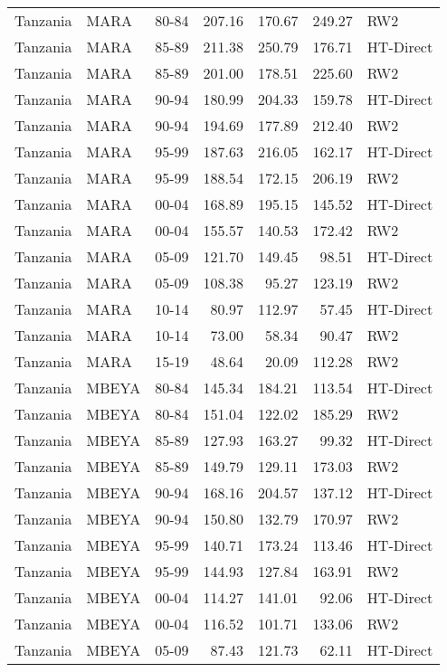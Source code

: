 \begin{longtable}{lllrrrl}
  Tanzania & MARA & 80-84 & 207.16 & 170.67 & 249.27 & RW2 \\ 
  Tanzania & MARA & 85-89 & 211.38 & 250.79 & 176.71 & HT-Direct \\ 
  Tanzania & MARA & 85-89 & 201.00 & 178.51 & 225.60 & RW2 \\ 
  Tanzania & MARA & 90-94 & 180.99 & 204.33 & 159.78 & HT-Direct \\ 
  Tanzania & MARA & 90-94 & 194.69 & 177.89 & 212.40 & RW2 \\ 
  Tanzania & MARA & 95-99 & 187.63 & 216.05 & 162.17 & HT-Direct \\ 
  Tanzania & MARA & 95-99 & 188.54 & 172.15 & 206.19 & RW2 \\ 
  Tanzania & MARA & 00-04 & 168.89 & 195.15 & 145.52 & HT-Direct \\ 
  Tanzania & MARA & 00-04 & 155.57 & 140.53 & 172.42 & RW2 \\ 
  Tanzania & MARA & 05-09 & 121.70 & 149.45 & 98.51 & HT-Direct \\ 
  Tanzania & MARA & 05-09 & 108.38 & 95.27 & 123.19 & RW2 \\ 
  Tanzania & MARA & 10-14 & 80.97 & 112.97 & 57.45 & HT-Direct \\ 
  Tanzania & MARA & 10-14 & 73.00 & 58.34 & 90.47 & RW2 \\ 
  Tanzania & MARA & 15-19 & 48.64 & 20.09 & 112.28 & RW2 \\ 
  Tanzania & MBEYA & 80-84 & 145.34 & 184.21 & 113.54 & HT-Direct \\ 
  Tanzania & MBEYA & 80-84 & 151.04 & 122.02 & 185.29 & RW2 \\ 
  Tanzania & MBEYA & 85-89 & 127.93 & 163.27 & 99.32 & HT-Direct \\ 
  Tanzania & MBEYA & 85-89 & 149.79 & 129.11 & 173.03 & RW2 \\ 
  Tanzania & MBEYA & 90-94 & 168.16 & 204.57 & 137.12 & HT-Direct \\ 
  Tanzania & MBEYA & 90-94 & 150.80 & 132.79 & 170.97 & RW2 \\ 
  Tanzania & MBEYA & 95-99 & 140.71 & 173.24 & 113.46 & HT-Direct \\ 
  Tanzania & MBEYA & 95-99 & 144.93 & 127.84 & 163.91 & RW2 \\ 
  Tanzania & MBEYA & 00-04 & 114.27 & 141.01 & 92.06 & HT-Direct \\ 
  Tanzania & MBEYA & 00-04 & 116.52 & 101.71 & 133.06 & RW2 \\ 
  Tanzania & MBEYA & 05-09 & 87.43 & 121.73 & 62.11 & HT-Direct \\ 

\end{longtable}
